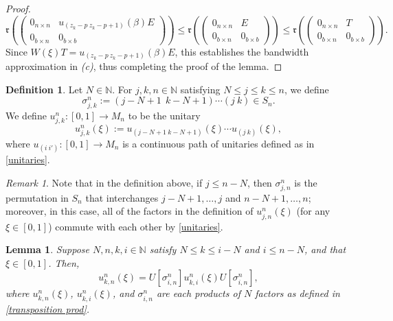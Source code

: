 \documentclass[12pt]{amsart}
\numberwithin{equation}{section}
\newtheorem{lemma}[theorem]{Lemma}
\theoremstyle{definition}
\newtheorem{definition}[theorem]{Definition}
\theoremstyle{remark}
\newtheorem{remark}[theorem]{Remark}
\newcommand{\NN}{\mathbb{N}}
\begin{document}
\begin{proof}
	$$
	\mathfrak{r}\left(
	\begin{pmatrix}
	0_{n\times n} & u_{(z_{k}-p \ z_{k}-p+1)}(\beta)E\\
	0_{b\times n} & 0_{b\times b}
	\end{pmatrix}
	\right)\leq
	\mathfrak{r}\left(
	\begin{pmatrix}
	0_{n\times n} & E\\
	0_{b\times n} & 0_{b\times b}
	\end{pmatrix}
	\right)\leq
	\mathfrak{r}\left(
	\begin{pmatrix}
	0_{n\times n} & T\\
	0_{b\times n} & 0_{b\times b}
	\end{pmatrix}\right).
	$$
	Since $W(\xi)T=u_{(z_{k}-p \ z_{k}-p+1)}(\beta)E$, this establishes the bandwidth approximation in \textit{(c)}, thus completing the proof of the lemma. 
\end{proof}


\begin{definition}
	\label{transposition prod}
	Let $N\in\NN$. For $j,k,n\in\NN$ satisfying $N\leq j\leq k\leq n$, we define
	$$
	\sigma^{n}_{j,k}:=(j-N+1 \ \ k-N+1)\cdots(j \ k)\in S_{n}.
	$$
	We define $u_{j,k}^{n}\colon[0,1]\to M_{n}$ to be the unitary
	$$
	u^{n}_{j,k}(\xi):=u_{(j-N+1  \ k-N+1)}(\xi)\cdots u_{(j \ k)}(\xi),
	$$
	where $u_{(i \ i')}\colon [0,1]\to M_{n}$ is a continuous path of unitaries defined as in \autoref{unitaries}. 
\end{definition}

\begin{remark}
	\label{commuting perms}
	Note that in the definition above, if $j\leq n-N$, then $\sigma^{n}_{j,n}$ is the permutation in $S_{n}$ that interchanges $j-N+1,\ldots,j$ and $n-N+1,\ldots,n$; moreover, in this case, all of the factors in the definition of $u^{n}_{j,n}(\xi)$ (for any $\xi\in[0,1]$) commute with each other by \autoref{unitaries}. 
\end{remark}

\begin{lemma}
	\label{factormain}
	Suppose $N,n,k,i\in\NN$ satisfy $N\leq k\leq i-N$ and $i\leq n-N$, and that $\xi\in[0,1]$. Then,
	$$
	u^{n}_{k,n}(\xi)=U[\sigma^{n}_{i,n}]u^{n}_{k,i}(\xi)U[\sigma^{n}_{i,n}],
	$$
	where $u^{n}_{k,n}(\xi)$, $u^{n}_{k,i}(\xi)$, and $\sigma^{n}_{i,n}$ are each products of $N$ factors as defined in \autoref{transposition prod}.
\end{lemma}
\end{document}
